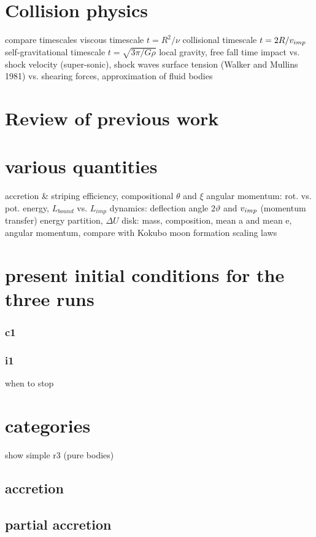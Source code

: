 \section{Collision physics}
compare timescales
viscous timescale $t = R^2 / \nu$
collisional timescale $t = 2 R / v_{imp}$
self-gravitational timescale $t = \sqrt{3\pi / G \rho}$
local gravity, free fall time
impact vs. shock velocity (super-sonic), shock waves
surface tension (Walker and Mullins 1981) vs. shearing forces, approximation of fluid bodies

\section{Review of previous work}


\section{various quantities}
accretion \& striping efficiency, compositional $\theta$ and $\xi$
angular momentum: rot. vs. pot. energy, $L_{bound}$ vs. $L_{imp}$
dynamics: deflection angle $2 \vartheta$ and $v_{imp}$ (momentum transfer)
energy partition, $\Delta U$
disk: mass, composition, mean a and mean e, angular momentum, compare with Kokubo moon formation scaling laws


\section{present initial conditions for the three runs}
\subsubsection{c1}
\subsubsection{i1}
when to stop

\section{\SSC categories}
show simple r3 (pure bodies)


\subsection{accretion}
\subsection{partial accretion}
